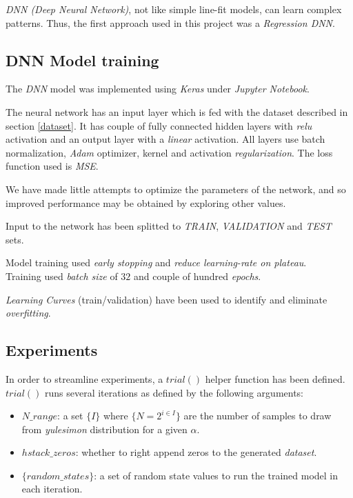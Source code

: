 \documentclass[a4paper, 12pt]{report}
\begin{document}
\par \textit{DNN (Deep Neural Network)}, not like simple line-fit models, can learn complex patterns. Thus, the first approach used in this project was a \textit{Regression DNN}.

\subsection{DNN Model training}
The \textit{DNN} model was implemented using \textit{Keras} under \textit{Jupyter Notebook}.

\par The neural network has an input layer which is fed with the dataset described in section \ref{dataset}. It has couple of fully connected hidden layers with \textit{relu} activation and an output layer with a \textit{linear} activation. All layers use batch normalization, \textit{Adam} optimizer, kernel and activation \textit{regularization}. The loss function used is \textit{MSE}.

\par We have made little attempts to optimize the parameters of the network, and
so improved performance may be obtained by exploring other values.

\par Input to the network has been splitted to \textit{TRAIN}, \textit{VALIDATION} and \textit{TEST} sets.

\par Model training used \textit{early stopping} and \textit{reduce learning-rate on plateau}.\\
Training used \textit{batch size} of $32$ and couple of hundred \textit{epochs}.

\textit{Learning Curves} (train/validation) have been used to identify and eliminate \textit{overfitting}.

\pagebreak
\subsection{Experiments}
In order to streamline experiments, a $trial()$ helper function has been defined.\\
$trial()$ runs several iterations as defined by the following arguments:

\begin{itemize}
  \item $N\_range$: a set $\{I\}$ where $\{N = 2^{i\in I}\}$ are the number of samples to draw from \textit{yulesimon} distribution for a given $\alpha$.
  \item $hstack\_zeros$: whether to right append zeros to the generated \textit{dataset}.
  \item $\{random\_states\}$: a set of random state values to run the trained model in each iteration.
\end{itemize}
\end{document}
